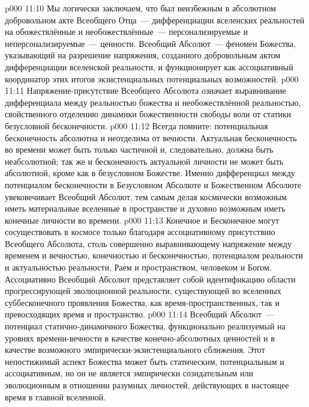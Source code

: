 \vs p000 11:10 \pc {}Мы логически заключаем, что  был неизбежным в абсолютном добровольном акте Всеобщего Отца~--- дифференциации вселенских реальностей на обожествлённые и необожествлённые~--- персонализируемые и неперсонализируемые~--- ценности. Всеобщий Абсолют~--- феномен Божества, указывающий на разрешение напряжения, созданного добровольным актом дифференциации вселенской реальности, и функционирует как ассоциативный координатор этих итогов экзистенциальных потенциальных возможностей.
\vs p000 11:11 \pc Напряжение\hyp{}присутствие Всеобщего Абсолюта означает выравнивание дифференциала между реальностью божества и необожествлённой реальностью, свойственного отделению динамики божественности свободы воли от статики безусловной бесконечности.
\vs p000 11:12 \pc Всегда помните: потенциальная бесконечность абсолютна и неотделима от вечности. Актуальная бесконечность во времени может быть только частичной и, следовательно, должна быть неабсолютной; так же и бесконечность актуальной личности не может быть абсолютной, кроме как в безусловном Божестве. Именно дифференциал между потенциалом бесконечности в Безусловном Абсолюте и Божественном Абсолюте увековечивает Всеобщий Абсолют, тем самым делая космически возможным иметь материальные вселенные в пространстве и духовно возможным иметь конечные личности во времени.
\vs p000 11:13 Конечное и Бесконечное могут сосуществовать в космосе только благодаря ассоциативному присутствию Всеобщего Абсолюта, столь совершенно выравнивающему напряжение между временем и вечностью, конечностью и бесконечностью, потенциалом реальности и актуальностью реальности, Раем и пространством, человеком и Богом. Ассоциативно Всеобщий Абсолют представляет собой идентификацию области прогрессирующей эволюционной реальности, существующей во вселенных суббесконечного проявления Божества, как время\hyp{}пространственных, так и превосходящих время и пространство.
\vs p000 11:14 Всеобщий Абсолют~--- потенциал статично\hyp{}динамичного Божества, функционально реализуемый на уровнях времени\hyp{}вечности в качестве конечно\hyp{}абсолютных ценностей и в качестве возможного эмпирически\hyp{}экзистенциального сближения. Этот непостижимый аспект Божества может быть статическим, потенциальным и ассоциативным, но он не является эмпирически созидательным или эволюционным в отношении разумных личностей, действующих в настоящее время в главной вселенной.
